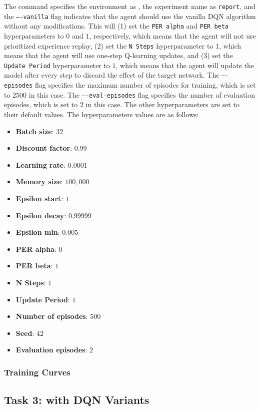 The command specifies the environment as \pong, the experiment name as \texttt{report}, and the \texttt{----vanilla} flag indicates that the agent should use the vanilla DQN algorithm without any modifications. This will (1) set the \texttt{PER alpha} and \texttt{PER beta} hyperparameters to $0$ and $1$, respectively, which means that the agent will not use prioritized experience replay, (2) set the \texttt{N Steps} hyperparameter to $1$, which means that the agent will use one-step Q-learning updates, and (3) set the \texttt{Update Period} hyperparameter to $1$, which means that the agent will update the model after every step to discard the effect of the target network.
The \texttt{----episodes} flag specifies the maximum number of episodes for training, which is set to $2500$ in this case.
The \texttt{----eval-episodes} flag specifies the number of evaluation episodes, which is set to $2$ in this case.
The other hyperparameters are set to their default values.
The hyperparameters values are as follows:
\begin{itemize}
    \item \textbf{Batch size}: $32$
    \item \textbf{Discount factor}: $0.99$
    \item \textbf{Learning rate}: $0.0001$
    \item \textbf{Memory size}: $100,000$
    \item \textbf{Epsilon start}: $1$
    \item \textbf{Epsilon decay}: $0.99999$
    \item \textbf{Epsilon min}: $0.005$
    \item \textbf{PER alpha}: $0$
    \item \textbf{PER beta}: $1$
    \item \textbf{N Steps}: $1$
    \item \textbf{Update Period}: $1$
    \item \textbf{Number of episodes}: $500$
    \item \textbf{Seed}: $42$
    \item \textbf{Evaluation episodes}: $2$
\end{itemize}

\subsubsection{Training Curves}

\subsection{Task 3: \pong with DQN Variants}

